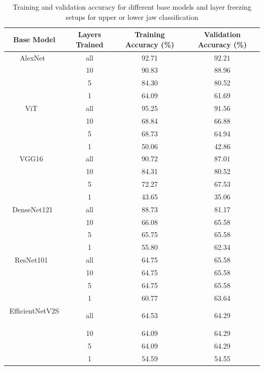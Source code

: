 \documentclass[english,twoside,openright]{UH_DS_MSc}
\begin{document}
\begin{table}[ht]
    \centering
        \scriptsize
        \begin{tabular}{|c|c|c|c|}
            \hline
            \textbf{Base Model} & \textbf{Layers Trained} & \textbf{Training Accuracy (\%)} & \textbf{Validation Accuracy (\%)}  \\ \hline
            AlexNet~\cite{alexnet}& all & 92.71 & $\mathbf{92.21}$       \\
            & 10 & 90.83 & 88.96          \\
             & 5    &84.30 & 80.52     \\
             & 1    & 64.09 & 61.69     \\\hline
             ViT ~\cite{vit}   & all  &95.25 & $\mathbf{91.56}$       \\
            & 10  & 68.84 & 66.88          \\
           & 5  & 68.73 & 64.94           \\
           & 1   &  50.06 & 42.86       \\\hline
           VGG16    ~\cite{vgg} & all  &90.72 & $\mathbf{87.01}$     \\
            & 10  & 84.31 & 80.52       \\
          & 5  &  72.27 & 67.53        \\
           & 1   &  43.65 & 35.06    \\\hline
          DenseNet121~\cite{densenet} & all  & 88.73 & 81.17   \\
            & 10  & 66.08 & 65.58  \\
           & 5  & 65.75 & 65.58   \\
           & 1   &  55.80 & 62.34   \\\hline
ResNet101 ~\cite{resnet}  & all  &            64.75 & 65.58  \\ 
           & 10  &  64.75 & 65.58    \\
           & 5  & 64.75 & 65.58   \\
          & 1   &   60.77 & 63.64  \\\hline
        EfficientNetV2S ~\cite{efficientnetv2}   & all  & 64.53 & 64.29   \\
            & 10  & 64.09 & 64.29    \\
           & 5  & 64.09 & 64.29  \\
          & 1   &   54.59 & 54.55  \\\hline
        \end{tabular}
    \caption{Training and validation accuracy for different base models and layer freezing setups for upper or lower jaw classification}
    \label{table:results}
\end{table}
\end{document}

